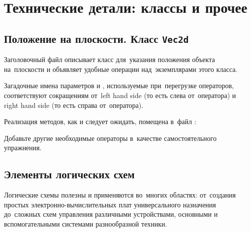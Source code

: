 
\chapter{Технические детали: классы и прочее}

\section{Положение на плоскости. Класс \texttt{Vec2d}}
Заголовочный файл  описывает класс  для~указания положения объекта на~плоскости и объявляет удобные операции над~экземплярами этого класса.

\noindent Загадочные имена параметров  и , используемые при~перегрузке операторов, соответствуют сокращениям от~\textenglish{left hand side} (то есть слева от~оператора) и \textenglish{right hand side} (то есть справа от~оператора).

Реализация методов, как и следует ожидать, помещена в~файл :

\noindent Добавьте другие необходимые операторы в~качестве самостоятельного упражнения.



\section{Элементы логических схем}
Логические схемы полезны и применяются во~многих областях: от~создания простых электронно-вычислительных плат универсального назначения до~сложных схем управления различными устройствами, основными и вспомогательными системами разнообразной техники.


